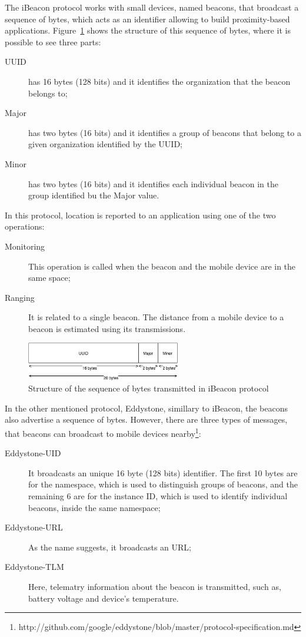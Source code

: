 The iBeacon protocol works with small devices, named beacons, that broadcast a sequence of bytes, which acts as an identifier allowing to build proximity-based applications\cite{ibeacon_book}.
Figure~\ref{fig:ibeacon_message} shows the structure of this sequence of bytes, where it is possible to see three parts:
\begin{description}
  \item[\gls{UUID}] has 16 bytes (128 bits) and it identifies the organization that the beacon belongs to;
  \item[Major] has two bytes (16 bits) and it identifies a group of beacons that belong to a given organization identified by the \gls{UUID};
  \item[Minor] has two bytes (16 bits) and it identifies each individual beacon in the group identified bu the Major value.
\end{description}
In this protocol, location is reported to an application using one of the two operations:
\begin{description}
  \item[Monitoring] This operation is called when the beacon and the mobile device are in the same space;
  \item[Ranging] It is related to a single beacon. The distance from a mobile device to a beacon is estimated using its transmissions.
\end{description}

\begin{figure}[!ht]
  \centering
    \includegraphics[width=0.6\textwidth, keepaspectratio]{figures/ibeacon_message}
    \caption[iBeacon message structure]{Structure of the sequence of bytes transmitted in iBeacon protocol}
    \label{fig:ibeacon_message}
\end{figure}

In the other mentioned protocol, Eddystone, simillary to iBeacon, the beacons also advertise a sequence of bytes.
However, there are three types of messages, that beacons can broadcast to mobile devices nearby\footnote{http://github.com/google/eddystone/blob/master/protocol-specification.md}:
\begin{description}
  \item[Eddystone-UID] It broadcasts an unique 16 byte (128 bits) identifier. The first 10 bytes are for the namespace, which is used to distinguish groups of beacons, and the remaining 6 are for the instance \gls{ID}, which is used to identify individual beacons, inside the same namespace;
  \item[Eddystone-URL] As the name suggests, it broadcasts an \gls{URL};
  \item[Eddystone-TLM] Here, telematry information about the beacon is transmitted, such as, battery voltage and device's temperature.
\end{description}

